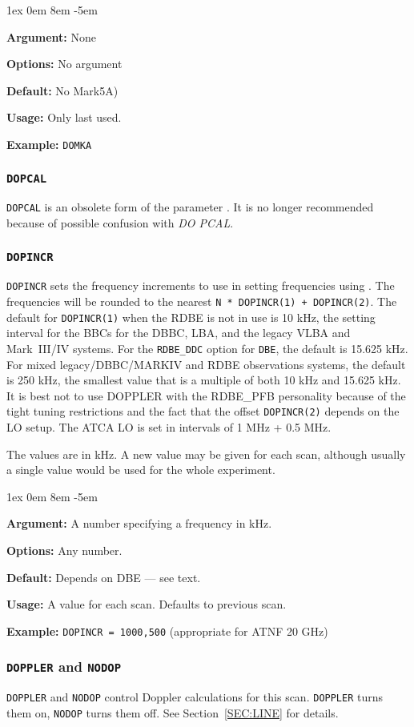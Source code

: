 \documentclass{report}
\newcommand{\rcwbox}[5]{
  \begin{list}{}{\parsep 1ex  \itemsep 0em
                 \leftmargin 8em  \itemindent -5em }
    \item {\bf Argument:} #1
    \item {\bf Options:}  #2
    \item {\bf Default:}  #3
    \item {\bf Usage:}    #4
    \item {\bf Example:}  #5
  \end{list}
}
\begin{document}
\rcwbox
{None}
{No argument}
{No Mark5A)}
{Only last used.}
{{\tt DOMKA}}



\subsubsection{\label{MP:DOPCAL}{\tt DOPCAL}}

{\tt DOPCAL} is an obsolete form of the parameter
.
It is no longer recommended because of possible confusion with
{\em DO PCAL}.

\subsubsection{\label{MP:DOPINCR}{\tt DOPINCR}}

{\tt DOPINCR} sets the frequency increments to use in setting
frequencies using .  The
frequencies will be rounded to the nearest {\tt N * DOPINCR(1) +
DOPINCR(2)}.  The default for {\tt DOPINCR(1)} when the RDBE is not in
use is 10 kHz, the setting interval for the BBCs for the DBBC, LBA,
and the legacy VLBA and Mark~III/IV systems.  For the {\tt RDBE\_DDC}
option for {\tt DBE}, the default is 15.625 kHz.  For mixed
legacy/DBBC/MARKIV and RDBE observations systems, the default is 250
kHz, the smallest value that is a multiple of both 10 kHz and 15.625
kHz.  It is best not to use DOPPLER with the RDBE\_PFB personality
because of the tight tuning restrictions and the fact that the offset
{\tt DOPINCR(2)} depends on the LO setup.  The ATCA LO is set in
intervals of 1 MHz + 0.5 MHz.

The values are in kHz.  A new value may be given for each scan,
although usually a single value would be used for the whole
experiment.

\rcwbox
{A number specifying a frequency in kHz.}
{Any number.}
{Depends on DBE --- see text.}
{A value for each scan.  Defaults to previous scan.}
{{\tt DOPINCR = 1000,500} (appropriate for ATNF 20 GHz)}


\subsubsection{\label{MP:DOPPLER}{\tt DOPPLER} and {\tt NODOP}}

{\tt DOPPLER} and {\tt NODOP} control Doppler calculations for this
scan.  {\tt DOPPLER} turns them on, {\tt NODOP} turns them off.
See Section~\ref{SEC:LINE} for details.
\end{document}
